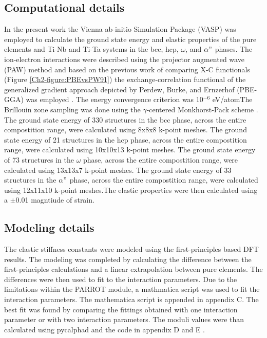 \subsection{Computational details}

In the present work the Vienna ab-initio Simulation Package (VASP) \cite{Kresse1996} was employed to calculate the ground state energy and elastic properties of the pure elements and Ti-Nb and Ti-Ta systems in the bcc, hcp, $\omega$, and $\alpha"$ phases. The ion-electron interactions were described using the projector augmented wave (PAW) \cite{Kresse1999,Blochl1994} method and based on the previous work of comparing X-C functionals (Figure \ref{Ch2-figure:PBEvsPW91}) the exchange-correlation functional of the generalized gradient approach depicted by Perdew, Burke, and Ernzerhof (PBE-GGA) was employed \cite{Perdew1996a}. The energy convergence criterion was 10$^{-6}$ eV/atomThe Brillouin zone sampling was done using the $\gamma$-centered Monkhorst-Pack scheme \cite{Monkhorst1976a}. The ground state energy of 330 structures in the bcc phase, across the entire compostition range, were calculated using 8x8x8 k-point meshes. The ground state energy of 21 structures in the hcp phase, across the entire compostition range, were calculated using 10x10x13 k-point meshes. The ground state energy of 73 structures in the $\omega$ phase, across the entire compostition range, were calculated using 13x13x7 k-point meshes. The ground state energy of 33 structures in the $\alpha"$ phase, across the entire compostition range, were calculated using 12x11x10 k-point meshes.The elastic properties were then calculated using a $\pm$0.01 magntiude of strain.

\subsection{Modeling details}

The elastic stiffness constants were modeled using the first-principles based DFT results. The modeling was completed by calculating the difference between the first-principles calculations and a linear extrapolation between pure elements. The differences were then used to fit to the interaction parameters. Due to the limitations within the PARROT module, a mathmatica script was used to fit the interaction parameters. The mathematica script is appended in appendix C. The best fit was found by comparing the fittings obtained with one interaction parameter or with two interaction parameters. The moduli values were than calculated using pycalphad and the code in appendix D and E \cite{Otis2017}.

